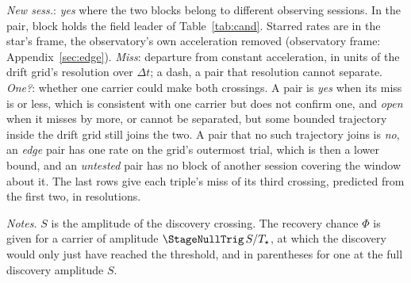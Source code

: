 \begin{table}
\centering
\caption{\textbf{Can two crossings be one carrier?} The \TjNPair{} pairs
toward one star with an unattributed member, and each HD~14055 triple
(\S\ref{sec:etacrv}).}
\label{tab:pairs}
\scriptsize

\par\vspace{2pt}

\par\vspace{2pt}
{\scriptsize \emph{New sess.}: \emph{yes} where the two blocks belong to
different observing sessions. In the \EvAStar{} pair, block \LrFlBlock{}
holds the field leader of Table~\ref{tab:cand}. Starred rates are in the star's frame, the
observatory's own acceleration removed (observatory frame:
Appendix~\ref{sec:edge}). \emph{Miss}: departure from constant
acceleration, in units of the drift grid's resolution over $\Delta t$; a
dash, a pair that resolution cannot separate. \emph{One?}: whether one
carrier could make both crossings. A pair is \emph{yes} when its miss is
\TjAcceptSig{} or less, which is consistent with one carrier but does not
confirm one, and \emph{open} when it misses by more, or cannot be
separated, but some bounded trajectory inside the drift grid still joins the
two. A pair that no such
trajectory joins is \emph{no}, an \emph{edge} pair has one rate on the
grid's outermost trial, which is then a lower bound, and an \emph{untested}
pair has no block of another session covering the window about it. The
last rows give each triple's miss of its third crossing, predicted from the
first two, in resolutions.\par}
\end{table}

\begin{table}
\centering
\caption{\textbf{The field leader}, the crossing whose stellar statistic
exceeds all \NCtrl{} control positions of its own window
(\S\ref{sec:vistest}).}
\label{tab:cand}
\footnotesize

\par\vspace{2pt}
{\scriptsize \emph{Notes.} $S$ is the amplitude of the discovery crossing.
The recovery chance $\Phi$ is given for a carrier of amplitude $\StageNullTrig\,S/T_\star$,
at which the discovery would only just have reached the threshold, and in
parentheses for one at the full discovery amplitude $S$.\par}
\end{table}
